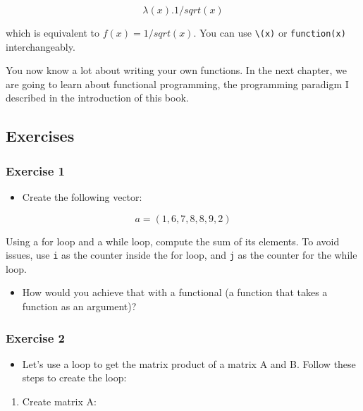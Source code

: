 \documentclass[
]{article}
\providecommand{\tightlist}{%
  \setlength{\itemsep}{0pt}\setlength{\parskip}{0pt}}
\begin{document}
\[
\lambda(x).1/sqrt(x)
\]

which is equivalent to \(f(x) = 1/sqrt(x)\). You can use \texttt{\textbackslash{}(x)} or \texttt{function(x)} interchangeably.

You now know a lot about writing your own functions. In the next chapter, we are going to learn
about functional programming, the programming paradigm I described in the introduction of this
book.

\hypertarget{exercises-5}{%
\subsection{Exercises}\label{exercises-5}}

\hypertarget{exercise-1-5}{%
\subsubsection*{Exercise 1}\label{exercise-1-5}}

\begin{itemize}
\tightlist
\item
  Create the following vector:
\end{itemize}

\[a = (1,6,7,8,8,9,2)\]

Using a for loop and a while loop, compute the sum of its elements. To avoid issues, use \texttt{i}
as the counter inside the for loop, and \texttt{j} as the counter for the while loop.

\begin{itemize}
\tightlist
\item
  How would you achieve that with a functional (a function that takes a function as an argument)?
\end{itemize}

\hypertarget{exercise-2-3}{%
\subsubsection*{Exercise 2}\label{exercise-2-3}}

\begin{itemize}
\tightlist
\item
  Let's use a loop to get the matrix product of a matrix A and B. Follow these steps to create the loop:
\end{itemize}

\begin{enumerate}
\def\labelenumi{\arabic{enumi})}
\tightlist
\item
  Create matrix A:
\end{enumerate}
\end{document}
